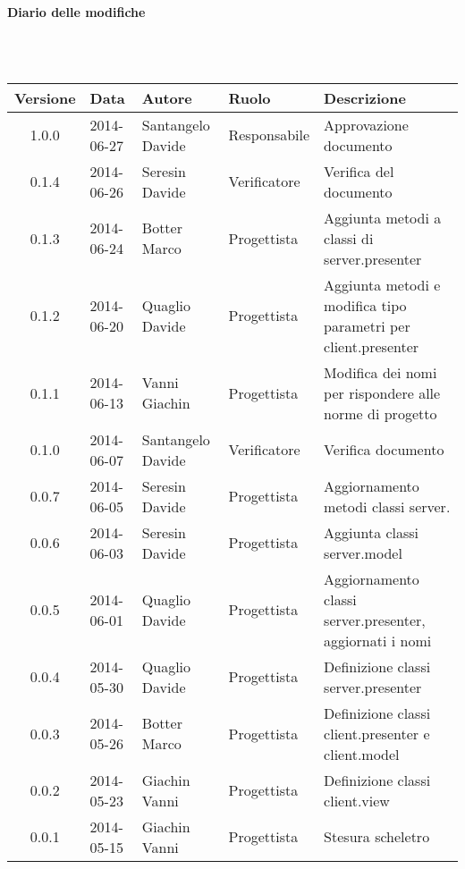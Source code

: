 \noindent\begin{Large}\textbf{Diario delle modifiche}\end{Large}\\
\\
\begin{small}
\begin{tabular}{|c|p{1.8cm}|p{2.8cm}|p{2.8cm}|p{3.5cm}|}
\hline
Versione & Data & Autore & Ruolo & Descrizione \\
\hline
\hline
1.0.0 &2014-06-27&Santangelo Davide&Responsabile&Approvazione documento\\
\hline
0.1.4 &2014-06-26&Seresin Davide&Verificatore&Verifica del documento\\
\hline
0.1.3 &2014-06-24&Botter Marco&Progettista&Aggiunta metodi a classi di server.presenter\\
\hline
0.1.2 &2014-06-20&Quaglio Davide&Progettista&Aggiunta metodi e modifica tipo parametri per client.presenter\\
\hline
0.1.1 &2014-06-13&Vanni Giachin&Progettista&Modifica dei nomi per rispondere alle norme di progetto\\
\hline
0.1.0 &2014-06-07&Santangelo Davide&Verificatore&Verifica documento\\
\hline
0.0.7 &2014-06-05&Seresin Davide&Progettista&Aggiornamento metodi classi server.\\
\hline
0.0.6 &2014-06-03&Seresin Davide&Progettista&Aggiunta classi server.model\\
\hline
0.0.5 &2014-06-01&Quaglio Davide&Progettista&Aggiornamento classi server.presenter, aggiornati i nomi\\
\hline
0.0.4 &2014-05-30&Quaglio Davide&Progettista&Definizione classi server.presenter\\
\hline
0.0.3 &2014-05-26&Botter Marco&Progettista&Definizione classi client.presenter e client.model\\
\hline
0.0.2 &2014-05-23&Giachin Vanni&Progettista&Definizione classi client.view\\
\hline
0.0.1 &2014-05-15&Giachin Vanni&Progettista&Stesura scheletro\\
\hline
\end{tabular}\\
\end{small}
